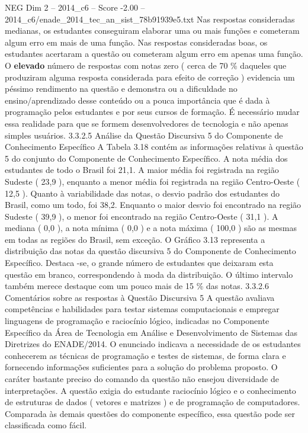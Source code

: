 \begin{textsample}{NEG Dim 2 – 2014\_c6 – Score -2.00 – 2014\_c6/enade\_2014\_tec\_an\_sist\_78b91939e5.txt}
Nas respostas consideradas medianas, os estudantes conseguiram elaborar uma ou mais funções e cometeram algum erro em mais de uma função.
Nas respostas consideradas boas, os estudantes acertaram a questão ou cometeram algum erro em apenas uma função.
O \textbf{elevado} número de respostas com notas zero ( cerca de 70 \% daqueles que produziram alguma resposta considerada para efeito de correção ) evidencia um péssimo rendimento na questão e demonstra ou a dificuldade no ensino/aprendizado desse conteúdo ou a pouca importância que é dada à programação pelos estudantes e por seus cursos de formação.
É necessário mudar essa realidade para que se formem desenvolvedores de tecnologia e não apenas simples usuários. 3.3.2.5 Análise da Questão Discursiva 5 do Componente de Conhecimento Específico A Tabela 3.18 contém as informações relativas à questão 5 do conjunto do Componente de Conhecimento Específico.
A nota média dos estudantes de todo o Brasil foi 21,1.
A maior média foi registrada na região Sudeste ( 23,9 ), enquanto a menor média foi registrada na região Centro-Oeste ( 12,5 ).
Quanto à variabilidade das notas, o desvio padrão dos estudantes do Brasil, como um todo, foi 38,2.
Enquanto o maior desvio foi encontrado na região Sudeste ( 39,9 ), o menor foi encontrado na região Centro-Oeste ( 31,1 ).
A mediana ( 0,0 ), a nota mínima ( 0,0 ) e a nota máxima ( 100,0 ) são as mesmas em todas as regiões do Brasil, sem exceção.
O Gráfico 3.13 representa a distribuição das notas da questão discursiva 5 do Componente de Conhecimento Específico.
Destaca -se, o grande número de estudantes que deixaram esta questão em branco, correspondendo à moda da distribuição.
O último intervalo também merece destaque com um pouco mais de 15 \% das notas. 3.3.2.6 Comentários sobre as respostas à Questão Discursiva 5 A questão avaliava competências e habilidades para testar sistemas computacionais e empregar linguagens de programação e raciocínio lógico, indicadas no Componente Específico da Área de Tecnologia em Análise e Desenvolvimento de Sistemas das Diretrizes do ENADE/2014.
O enunciado indicava a necessidade de os estudantes conhecerem as técnicas de programação e testes de sistemas, de forma clara e fornecendo informações suficientes para a solução do problema proposto.
O caráter bastante preciso do comando da questão não ensejou diversidade de interpretações.
A questão exigia do estudante raciocínio lógico e o conhecimento de estruturas de dados ( vetores e matrizes ) e de programação de computadores.
Comparada às demais questões do componente específico, essa questão pode ser classificada como fácil.

\end{textsample}
